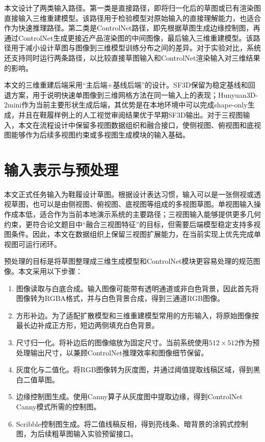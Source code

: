 本文设计了两类输入路径。第一类是直接路径，即将归一化后的草图或已有渲染图直接输入三维重建模型。该路径用于检验模型对原始输入的直接理解能力，也适合作为快速推理路径。第二类是ControlNet路径，即先根据草图生成边缘控制图，再通过ControlNet生成更接近产品渲染图的中间图像，最后输入三维重建模型。该路径用于减小设计草图与图像到三维模型训练分布之间的差异。对于实验对比，系统还支持同时运行两条路径，以比较直接草图输入和ControlNet渲染输入对三维结果的影响。

本文的三维重建后端采用“主后端+基线后端”的设计。SF3D保留为稳定基线和回退方案，用于说明快速单图像到三维网格方法在同一输入上的表现；Hunyuan3D-2mini作为当前主要形状生成后端，其优势是在本地环境中可以完成shape-only生成，并且在鞋履样例上的人工视觉审阅结果优于早期SF3D输出。对于三视图输入，本文在流程设计中保留多视图数据组织和融合接口，使侧视图、俯视图和底视图能够作为后续多视图约束或多视图生成模块的输入基础。

\section{输入表示与预处理}

本文正式任务输入为鞋履设计草图。根据设计表达习惯，输入可以是一张侧视或透视草图，也可以是由侧视图、俯视图、底视图等组成的多视图草图。单视图输入操作成本低，适合作为当前本地演示系统的主要路径；三视图输入能够提供更多几何约束，更符合论文题目中“融合三视图特征”的目标，但需要后端模型稳定支持多视图条件。因此，本文在数据组织上保留三视图扩展能力，在当前实现上优先完成单视图可运行闭环。

预处理的目标是将草图整理成三维生成模型和ControlNet模块更容易处理的规范图像。本文采用以下步骤：

\begin{enumerate}
  \item 图像读取与白底合成。输入图像可能带有透明通道或非白色背景，因此首先将图像转为RGBA格式，并与白色背景合成，得到三通道RGB图像。
  \item 方形补边。为了适配扩散模型和三维重建模型常用的方形输入，将原始图像按最长边补成正方形，短边两侧填充白色背景。
  \item 尺寸归一化。将补边后的图像缩放为固定尺寸。当前系统使用$512\times512$作为预处理输出尺寸，以兼顾ControlNet推理效率和图像细节保留。
  \item 灰度化与二值化。将RGB图像转为灰度图，并通过阈值提取线稿区域，得到黑白二值草图。
  \item 边缘控制图生成。使用Canny算子从灰度图中提取边缘，得到ControlNet Canny模式所需的控制图。
  \item Scribble控制图生成。将二值线稿反相，得到亮线条、暗背景的涂鸦式控制图，为后续粗草图输入实验预留接口。
\end{enumerate}

